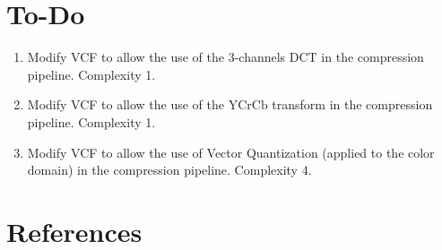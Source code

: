 \section{To-Do}
\begin{enumerate}
\item Modify VCF to allow the use of the 3-channels DCT in the
  compression pipeline. Complexity 1.
\item Modify VCF to allow the use of the $\text{YCrCb}$ transform in
  the compression pipeline. Complexity 1.
\item Modify VCF to allow the use of Vector Quantization (applied to
  the color domain) in the compression pipeline. Complexity 4.
\end{enumerate}

\section{References}

\renewcommand{\addcontentsline}[3]{}%

